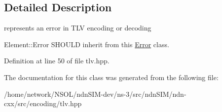 \subsection{Detailed Description}
represents an error in T\+LV encoding or decoding 

Element\+::\+Error S\+H\+O\+U\+LD inherit from this \hyperlink{classndn_1_1tlv_1_1Error}{Error} class. 

Definition at line 50 of file tlv.\+hpp.



The documentation for this class was generated from the following file\+:\begin{DoxyCompactItemize}
\item 
/home/network/\+N\+S\+O\+L/ndn\+S\+I\+M-\/dev/ns-\/3/src/ndn\+S\+I\+M/ndn-\/cxx/src/encoding/tlv.\+hpp\end{DoxyCompactItemize}
